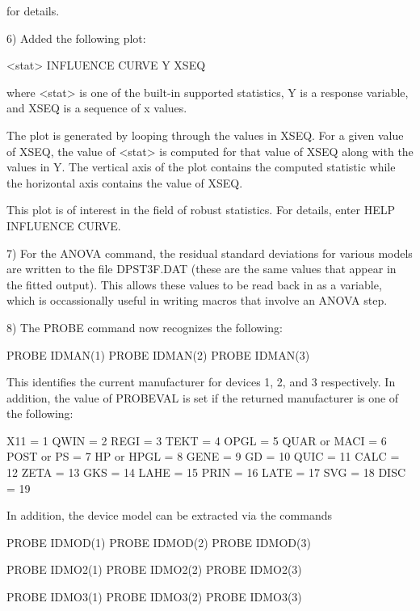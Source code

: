 {    for details.

 6) Added the following plot:

      <stat> INFLUENCE CURVE Y XSEQ

    where <stat> is one of the built-in supported statistics,
    Y is a response variable, and XSEQ is a sequence of x values.

    The plot is generated by looping through the values in XSEQ.
    For a given value of XSEQ, the value of <stat> is computed for
    that value of XSEQ along with the values in Y.  The vertical
    axis of the plot contains the computed statistic while the
    horizontal axis contains the value of XSEQ.

    This plot is of interest in the field of robust statistics.
    For details, enter HELP INFLUENCE CURVE.

 7) For the ANOVA command, the residual standard deviations for
    various models are written to the file DPST3F.DAT (these are
    the same values that appear in the fitted output).  This
    allows these values to be read back in as a variable, which
    is occassionally useful in writing macros that involve an
    ANOVA step.

 8) The PROBE command now recognizes the following:

        PROBE IDMAN(1)
        PROBE IDMAN(2)
        PROBE IDMAN(3)

    This identifies the current manufacturer for devices 1, 2, and
    3 respectively.  In addition, the value of PROBEVAL is set
    if the returned manufacturer is one of the following:

          X11           = 1
          QWIN          = 2
          REGI          = 3
          TEKT          = 4
          OPGL          = 5
          QUAR or MACI  = 6
          POST or PS    = 7
          HP or HPGL    = 8
          GENE          = 9
          GD            = 10
          QUIC          = 11
          CALC          = 12
          ZETA          = 13
          GKS           = 14
          LAHE          = 15
          PRIN          = 16
          LATE          = 17
          SVG           = 18
          DISC          = 19

    In addition, the device model can be extracted via the commands

        PROBE IDMOD(1)
        PROBE IDMOD(2)
        PROBE IDMOD(3)

        PROBE IDMO2(1)
        PROBE IDMO2(2)
        PROBE IDMO2(3)

        PROBE IDMO3(1)
        PROBE IDMO3(2)
        PROBE IDMO3(3)

}
